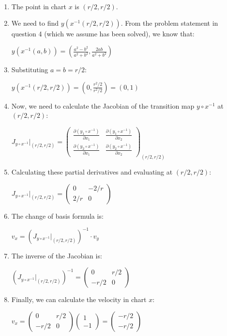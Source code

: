 \documentclass{article}
\begin{document}
\begin{enumerate}
    \item The point in chart $x$ is $(r/2, r/2)$.
    
    \item We need to find $y(x^{-1}(r/2, r/2))$. From the problem statement in question 4 (which we assume has been solved), we know that:
    
    $y(x^{-1}(a, b)) = (\frac{a^2-b^2}{a^2+b^2}, \frac{2ab}{a^2+b^2})$
    
    \item Substituting $a = b = r/2$:
    
    $y(x^{-1}(r/2, r/2)) = (0, \frac{r^2/2}{r^2/2}) = (0, 1)$
    
    \item Now, we need to calculate the Jacobian of the transition map $y \circ x^{-1}$ at $(r/2, r/2)$:
    
    $J_{y \circ x^{-1}}|_{(r/2, r/2)} = \begin{pmatrix}
    \frac{\partial (y_1 \circ x^{-1})}{\partial x_1} & \frac{\partial (y_1 \circ x^{-1})}{\partial x_2} \\
    \frac{\partial (y_2 \circ x^{-1})}{\partial x_1} & \frac{\partial (y_2 \circ x^{-1})}{\partial x_2}
    \end{pmatrix}_{(r/2, r/2)}$
    
    \item Calculating these partial derivatives and evaluating at $(r/2, r/2)$:
    
    $J_{y \circ x^{-1}}|_{(r/2, r/2)} = \begin{pmatrix}
    0 & -2/r \\
    2/r & 0
    \end{pmatrix}$
    
    \item The change of basis formula is:
    
    $v_x = (J_{y \circ x^{-1}}|_{(r/2, r/2)})^{-1} \cdot v_y$
    
    \item The inverse of the Jacobian is:
    
    $(J_{y \circ x^{-1}}|_{(r/2, r/2)})^{-1} = \begin{pmatrix}
    0 & r/2 \\
    -r/2 & 0
    \end{pmatrix}$
    
    \item Finally, we can calculate the velocity in chart $x$:
    
    $v_x = \begin{pmatrix}
    0 & r/2 \\
    -r/2 & 0
    \end{pmatrix} \begin{pmatrix}
    1 \\ -1
    \end{pmatrix} = \begin{pmatrix}
    -r/2 \\ -r/2
    \end{pmatrix}$
\end{enumerate}
\end{document}
